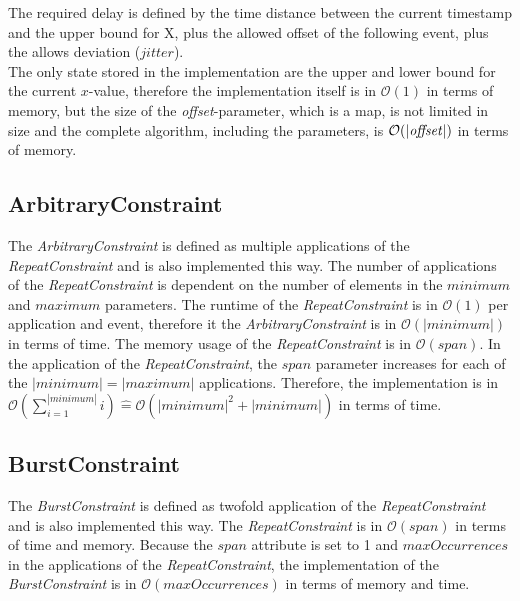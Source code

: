	The required delay is defined by the time distance between the current timestamp and the upper bound for X, plus the allowed offset of the following event, plus the allows deviation ($jitter$).\\
	The only state stored in the implementation are the upper and lower bound for the  current $x$-value, therefore the implementation itself is in $\mathcal{O}(1)$ in terms of memory, but the size of the \textit{offset}-parameter, which is a map, is not limited in size and the complete algorithm, including the parameters, is $\mathcal{O}(|\text{\textit{offset}}|)$ in terms of memory.
	
\subsection{ArbitraryConstraint}
	The \emph{ArbitraryConstraint} is defined as multiple applications of the \emph{RepeatConstraint} and is also implemented this way. The number of applications of the \emph{RepeatConstraint} is dependent on the number of elements in the $minimum$ and $maximum$ parameters. The runtime of the \emph{RepeatConstraint} is in $\mathcal{O}(1)$ per application and event, therefore it the \emph{ArbitraryConstraint} is in $\mathcal{O}(|minimum|)$ in terms of time. The memory usage of the \emph{RepeatConstraint} is in $\mathcal{O}(span)$. In the application of the \emph{RepeatConstraint}, the $span$ parameter increases for each of the $|minimum| = |maximum|$ applications. Therefore, the implementation is in $\mathcal{O}(\sum_{i=1}^{|minimum|}i)\widehat{=}\mathcal{O}(|minimum|^2+|minimum|)$ in terms of time.

\subsection{BurstConstraint}
	The \textit{BurstConstraint} is defined as twofold application of the \emph{RepeatConstraint} and is also implemented this way. The \textit{RepeatConstraint} is in $\mathcal{O}(span)$ in terms of time and memory. Because the $span$ attribute is set to 1 and $maxOccurrences$ in the applications of the \textit{RepeatConstraint}, the implementation of the \emph{BurstConstraint} is in $\mathcal{O}(maxOccurrences)$ in terms of memory and time.

